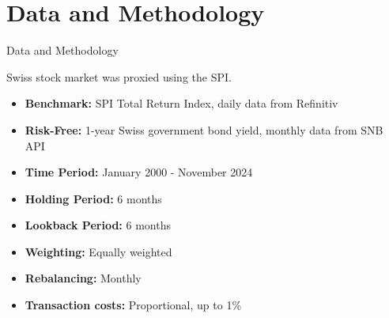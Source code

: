 \documentclass[10pt]{beamer}
\begin{document}
\section{Data and Methodology}
\begin{frame}[fragile]{Data and Methodology}

\noindent %
\begin{minipage}[t]{0.45\textwidth} %
    \begin{tcolorbox}[colframe=datagreen, colback=boxbg, coltitle=white, title=Data, sharp corners=all, fonttitle=\bfseries, left=2mm, right=2mm, enhanced, height=6cm]
        Swiss stock market was proxied using the SPI. 
        \begin{itemize}
            \item \textbf{Benchmark:} SPI Total Return Index, daily data from Refinitiv
            \item \textbf{Risk-Free:} 1-year Swiss government bond yield, monthly data from SNB API
            \item \textbf{Time Period:} January 2000 - November 2024
        \end{itemize}
    \end{tcolorbox}
\end{minipage}%
\hspace{0.05\textwidth} %
\begin{minipage}[t]{0.45\textwidth} %
    \begin{tcolorbox}[colframe=strategyblue, colback=boxbg, coltitle=white, title=Methodology, sharp corners=all, fonttitle=\bfseries, left=2mm, right=2mm, enhanced, height=6cm]
        \begin{itemize}
            \item \textbf{Holding Period:} 6 months
            \item \textbf{Lookback Period:} 6 months
            \item \textbf{Weighting:} Equally weighted
            \item \textbf{Rebalancing:} Monthly
            \item \textbf{Transaction costs:} Proportional, up to 1\%
        \end{itemize}
    \end{tcolorbox}
\end{minipage}

\end{frame}

\end{document}
